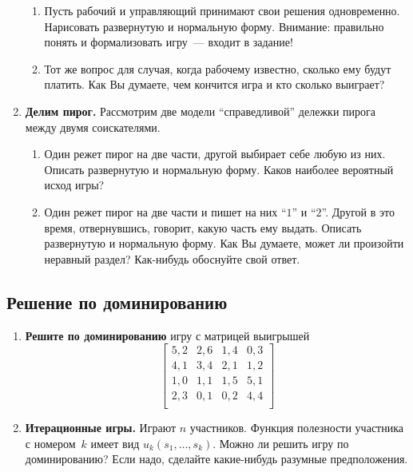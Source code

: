 \documentclass[a4paper,12pt]{article}
\begin{document}
\begin{enumerate}
\begin{enumerate}

\item Пусть рабочий и управляющий принимают свои решения
одновременно. Нарисовать развернутую и нормальную форму.
Внимание: правильно понять и формализовать игру~--- входит
в задание!


\item Тот же вопрос для случая, когда рабочему известно,
сколько ему будут платить. Как Вы думаете, чем кончится
игра и кто сколько выиграет?

\end{enumerate}

\item {\bf Делим пирог.} Рассмотрим две модели
``справедливой'' дележки пирога между двумя соискателями.

\begin{enumerate}

\item Один режет пирог на две части, другой выбирает себе
любую из них. Описать развернутую и нормальную форму. Каков
наиболее вероятный исход игры?

\item Один режет пирог на две части и пишет на них ``$1$''
и ``$2$''. Другой в это время, отвернувшись, говорит, какую
часть ему выдать. Описать развернутую и нормальную форму.
Как Вы думаете, может ли произойти неравный раздел?
Как-нибудь обоснуйте свой ответ.

\end{enumerate}

\end{enumerate}

\subsection{Решение по доминированию}

\begin{enumerate}

\item {\bf Решите по доминированию} игру с матрицей
выигрышей
\[\left[\begin{array}{cccc} 5,2&2,6&1,4&0,3\\ 4,1&3,4&2,1&1,2\\
1,0&1,1&1,5&5,1\\ 2,3&0,1&0,2&4,4\\
\end{array}\right]\]

\item {\bf Итерационные игры.} Играют $n$ участников.
Функция полезности участника с номером~$k$ имеет вид
$u_k(s_1,\ldots,s_k)$. Можно ли решить игру по
доминированию? Если надо, сделайте какие-нибудь разумные
предположения.

\end{enumerate}
\end{document}
